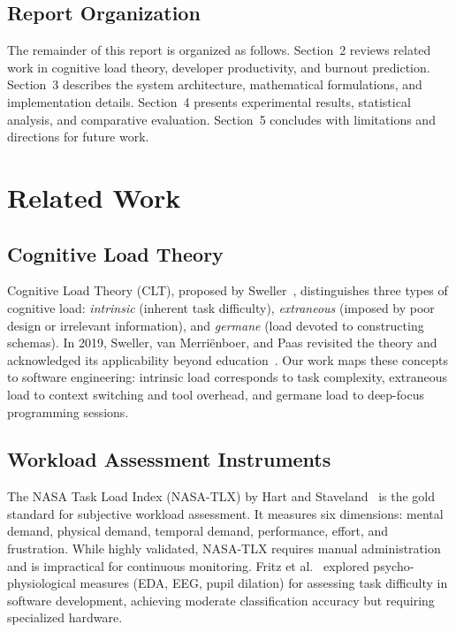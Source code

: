 \documentclass[12pt]{article}
\begin{document}
\subsection{Report Organization}

The remainder of this report is organized as follows. Section~2 reviews related work in cognitive load theory, developer productivity, and burnout prediction. Section~3 describes the system architecture, mathematical formulations, and implementation details. Section~4 presents experimental results, statistical analysis, and comparative evaluation. Section~5 concludes with limitations and directions for future work.

\newpage

\section{Related Work}

\subsection{Cognitive Load Theory}

Cognitive Load Theory (CLT), proposed by Sweller~\cite{sweller1988cognitive}, distinguishes three types of cognitive load: \emph{intrinsic} (inherent task difficulty), \emph{extraneous} (imposed by poor design or irrelevant information), and \emph{germane} (load devoted to constructing schemas). In 2019, Sweller, van Merri\"{e}nboer, and Paas revisited the theory and acknowledged its applicability beyond education~\cite{sweller2019cognitive}. Our work maps these concepts to software engineering: intrinsic load corresponds to task complexity, extraneous load to context switching and tool overhead, and germane load to deep-focus programming sessions.

\subsection{Workload Assessment Instruments}

The NASA Task Load Index (NASA-TLX) by Hart and Staveland~\cite{hart1988development} is the gold standard for subjective workload assessment. It measures six dimensions: mental demand, physical demand, temporal demand, performance, effort, and frustration. While highly validated, NASA-TLX requires manual administration and is impractical for continuous monitoring. Fritz et al.~\cite{fritz2014developers} explored psycho-physiological measures (EDA, EEG, pupil dilation) for assessing task difficulty in software development, achieving moderate classification accuracy but requiring specialized hardware.
\end{document}
